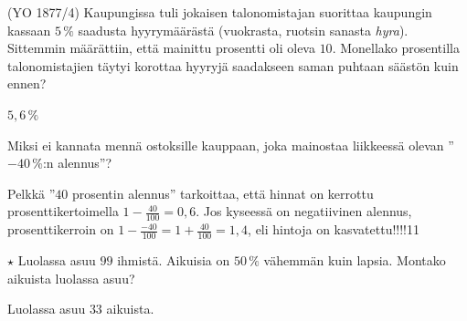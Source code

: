 \begin{tehtavasivu}
\begin{tehtava}
    (YO 1877/4) Kaupungissa tuli jokaisen talonomistajan suorittaa kaupungin kassaan $5\,\%$ saadusta hyyrymäärästä (vuokrasta, ruotsin sanasta \textit{hyra}). Sittemmin määrättiin, että mainittu prosentti oli oleva $10$. Monellako prosentilla talonomistajien täytyi korottaa hyyryjä saadakseen saman puhtaan säästön kuin ennen?
    \begin{vastaus}
        $5,6\,\%$
    \end{vastaus}
\end{tehtava}
	
\begin{tehtava}
Miksi ei kannata mennä ostoksille kauppaan, joka mainostaa liikkeessä olevan ''$-40$\,\%:n alennus''?
	\begin{vastaus}
	Pelkkä ''$40$ prosentin alennus'' tarkoittaa, että hinnat on kerrottu prosenttikertoimella $1-\frac{40}{100}=0,6$. Jos kyseessä on negatiivinen alennus, prosenttikerroin on $1-\frac{-40}{100}=1+\frac{40}{100}=1,4$, eli hintoja on kasvatettu!!!!11
	\end{vastaus}
\end{tehtava}	

\begin{tehtava} 
		$\star$ Luolassa asuu $99$ ihmistä. Aikuisia on $50\,\%$ vähemmän kuin lapsia. Montako aikuista luolassa asuu?
	\begin{vastaus}
	Luolassa asuu $33$ aikuista.
	\end{vastaus}
\end{tehtava}

\end{tehtavasivu}